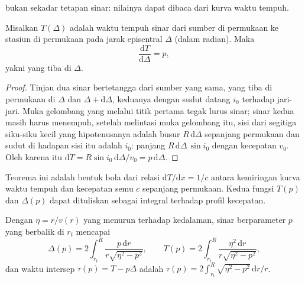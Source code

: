 \begin{omfigure}
\par{}
\label{fig:b3:seismology-imaging:shells}
\end{omfigure}

 bukan sekadar tetapan sinar: nilainya dapat dibaca dari
kurva waktu tempuh.

\begin{theorem}\label{thm:b3:seismology-imaging:benndorf}
Misalkan $T(\Delta)$ adalah waktu tempuh sinar dari sumber di permukaan ke
stasiun di permukaan pada jarak episentral $\Delta$ (dalam radian). Maka
\[
  \frac{\mathrm dT}{\mathrm d\Delta} = p ,
\]
yakni  yang tiba di $\Delta$.
\end{theorem}

\begin{proof}
Tinjau dua sinar bertetangga dari sumber yang sama, yang tiba di permukaan
di $\Delta$ dan $\Delta + \mathrm d\Delta$, keduanya dengan sudut datang $i_0$
terhadap jari-jari. Muka gelombang yang melalui titik pertama tegak lurus sinar;
sinar kedua masih harus menempuh, setelah melintasi muka gelombang itu, sisi
dari segitiga siku-siku kecil yang hipotenusanya adalah busur $R\,\mathrm d\Delta$ sepanjang
permukaan dan sudut di hadapan sisi itu adalah $i_0$: panjang
$R\,\mathrm d\Delta\,\sin i_0$ dengan kecepatan $v_0$. Oleh karena itu
$\mathrm dT = R\sin i_0\,\mathrm d\Delta/v_0 = p\,\mathrm d\Delta$.
\end{proof}

Teorema ini adalah bentuk bola dari relasi $\mathrm dT/\mathrm dx = 1/c$
antara kemiringan kurva waktu tempuh dan kecepatan semu $c$ sepanjang
permukaan. Kedua fungsi $T(p)$ dan $\Delta(p)$ dapat dituliskan sebagai integral
terhadap profil kecepatan.

\begin{proposition}\label{prop:b3:seismology-imaging:integrals}
Dengan $\eta = r/v(r)$ yang menurun terhadap kedalaman, sinar berparameter $p$ yang berbalik
di $r_t$ mencapai
\[
  \Delta(p) = 2\int_{r_t}^{R}\frac{p\,\mathrm dr}{r\sqrt{\eta^2 - p^2}},
  \qquad
  T(p) = 2\int_{r_t}^{R}\frac{\eta^2\,\mathrm dr}{r\sqrt{\eta^2 - p^2}},
\]
dan waktu intersep $\tau(p) = T - p\Delta$ adalah
$\tau(p) = 2\int_{r_t}^{R}\sqrt{\eta^2 - p^2}\,\mathrm dr/r$.
\end{proposition}

